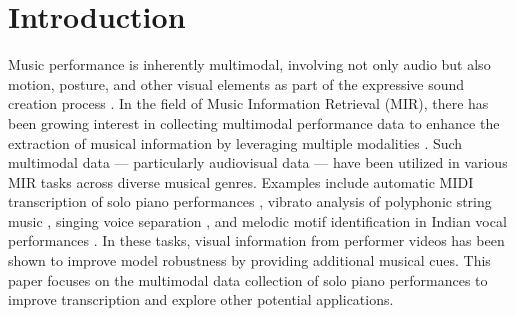 \documentclass{article}
\begin{document}
\section{Introduction}\label{sec:introduction}


Music performance is inherently multimodal, involving not only audio but also motion, posture, and other visual elements as part of the expressive sound creation process \cite{PPR09Bergeron, MusicPercep12Platz}. In the field of Music Information Retrieval (MIR), there has been growing interest in collecting multimodal performance data to enhance the extraction of musical information by leveraging multiple modalities \cite{TMM18Li, IEEE19Duan}. Such multimodal data — particularly audiovisual data — have been utilized in various MIR tasks across diverse musical genres. Examples include automatic MIDI transcription of solo piano performances \cite{ICASSP20Koepke, ICASSPW23Li}, vibrato analysis of polyphonic string music \cite{SMC17Li}, singing voice separation \cite{BMVC21Montesinos}, and melodic motif identification in Indian vocal performances \cite{TISMIR24Nadkarni}. In these tasks, visual information from performer videos has been shown to improve model robustness by providing additional musical cues. This paper focuses on the multimodal data collection of solo piano performances to improve transcription and explore other potential applications.  
\end{document}
